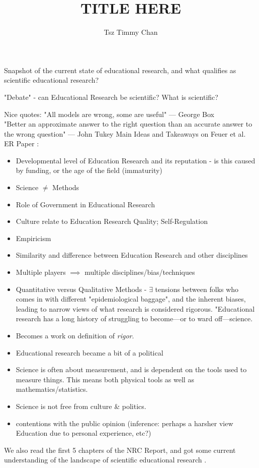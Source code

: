 \documentclass{TC}
\title{TITLE HERE}	%
\author{Tsz Timmy Chan}	%
\begin{document}
Snapshot of the current state of educational research, and what qualifies as scientific educational research?

"Debate" - can Educational Research be scientific? What is scientific?

Nice quotes:
"All models are wrong, some are useful" --- George Box\\
"Better an approximate answer to the right question than an accurate answer to the wrong question" --- John Tukey
Main Ideas and Takeaways on Feuer et al. ER Paper \parencite{feuer_scientific_2002}: 
	\begin{itemize}
	\item Developmental level of Education Research and its reputation - is this caused by funding, or the age of the field (immaturity)
	\item Science $\neq$ Methods
	\item Role of Government in Educational Research
	\item Culture relate to Education Research Quality; Self-Regulation
	\item Empiricism
	\item Similarity and difference between Education Research and other disciplines
	\item Multiple players $\implies$ multiple disciplines/bias/techniques
	\item Quantitative versus Qualitative Methods - $\exists$ tensions between folks who comes in with different "epidemiological baggage", and the inherent biases, leading to narrow views of what research is considered rigorous. "Educational research has a long history of struggling to become---or to ward off---science.
	\item Becomes a work on definition of \emph{rigor}.
	\item Educational research became a bit of a political 
	\item Science is often about measurement, and is dependent on the tools used to measure things. This means both physical tools as well as mathematics/statistics. 
	\item Science is not free from culture \& politics.
	\item contentions with the public opinion (inference: perhaps a harsher view Education due to personal experience, etc?)
	\end{itemize}




We also read the first 5 chapters of the NRC Report, and got some current understanding of the landscape of scientific educational research \parencite{national_research_council_introduction_2002, national_research_council_accumulation_2002, national_research_council_guiding_2002, national_research_council_features_2002, national_research_council_designs_2002}.
\end{document}
